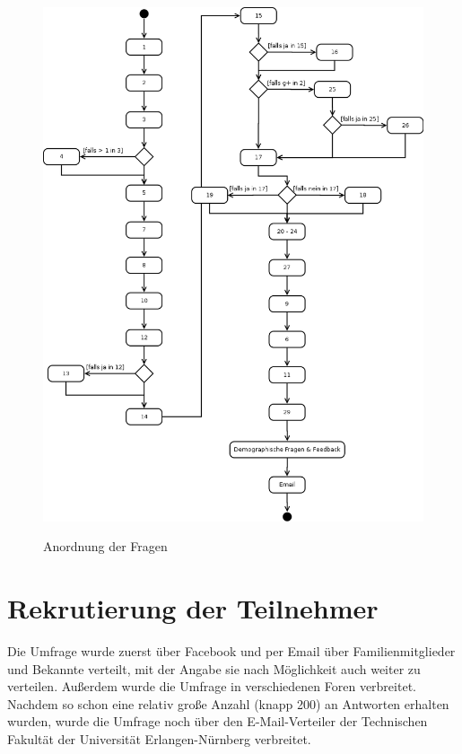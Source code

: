 \begin{figure}[H]
\centering
\includegraphics[height=\textheight]{images/umldia}\\
\caption{Anordnung der Fragen}\label{umldia}
\end{figure}


\section{Rekrutierung der Teilnehmer}
Die Umfrage wurde zuerst über Facebook und per Email über Familienmitglieder und Bekannte verteilt, mit der Angabe sie nach Möglichkeit auch weiter zu verteilen. Außerdem wurde die Umfrage in verschiedenen Foren verbreitet. Nachdem so schon eine relativ große Anzahl (knapp 200) an Antworten erhalten wurden, wurde die Umfrage noch über den E-Mail-Verteiler der Technischen Fakultät der Universität Erlangen-Nürnberg verbreitet.